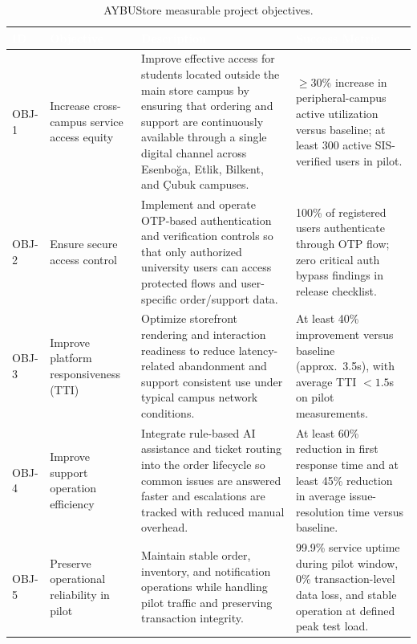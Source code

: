 \documentclass[11pt,a4paper]{article}
\begin{document}
\renewcommand{\arraystretch}{1.25}
\begin{table}[H]
\centering
\small
\begin{tabular}{|p{}|p{}|p{}|p{}|}
\hline
\rowcolor{aybuHeader}
\textcolor{white}{\textbf{ID}} &
\textcolor{white}{\textbf{Objective}} &
\textcolor{white}{\textbf{Description}} &
\textcolor{white}{\textbf{Success Metric}} \\ \hline

OBJ-1 & Increase cross-campus service access equity &
Improve effective access for students located outside the main store
campus by ensuring that ordering and support are continuously available
through a single digital channel across Esenboğa, Etlik, Bilkent, and
Çubuk campuses. &
$\geq 30\%$ increase in peripheral-campus active utilization versus
baseline; at least 300 active SIS-verified users in pilot. \\ \hline

OBJ-2 & Ensure secure access control &
Implement and operate OTP-based authentication and verification
controls so that only authorized university users can access protected
flows and user-specific order/support data. &
100\% of registered users authenticate through OTP flow; zero critical
auth bypass findings in release checklist. \\ \hline

OBJ-3 & Improve platform responsiveness (TTI) &
Optimize storefront rendering and interaction readiness to reduce
latency-related abandonment and support consistent use under typical
campus network conditions. &
At least 40\% improvement versus baseline (approx.\ 3.5s), with average
TTI $< 1.5$s on pilot measurements. \\ \hline

OBJ-4 & Improve support operation efficiency &
Integrate rule-based AI assistance and ticket routing into the order
lifecycle so common issues are answered faster and escalations are
tracked with reduced manual overhead. &
At least 60\% reduction in first response time and at least 45\%
reduction in average issue-resolution time versus baseline. \\ \hline

OBJ-5 & Preserve operational reliability in pilot &
Maintain stable order, inventory, and notification operations while
handling pilot traffic and preserving transaction integrity. &
99.9\% service uptime during pilot window, 0\% transaction-level data
loss, and stable operation at defined peak test load. \\ \hline
\end{tabular}
\caption{AYBUStore measurable project objectives.}
\label{tab:objectives}
\end{table}
\end{document}
